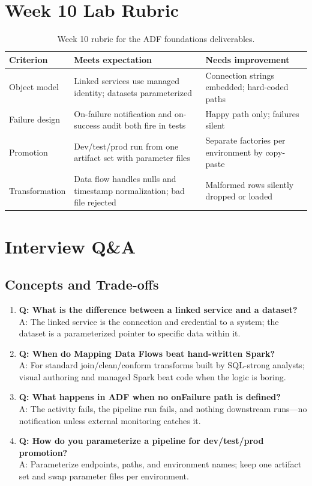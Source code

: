 \section{Week 10 Lab Rubric}
\begin{table}[H]
\centering
\small
\begin{tabular}{@{}p{3.2cm}p{5.0cm}p{5.0cm}@{}}
\toprule
\textbf{Criterion} & \textbf{Meets expectation} & \textbf{Needs improvement} \\
\midrule
Object model & Linked services use managed identity; datasets parameterized & Connection strings embedded; hard-coded paths \\
Failure design & On-failure notification and on-success audit both fire in tests & Happy path only; failures silent \\
Promotion & Dev/test/prod run from one artifact set with parameter files & Separate factories per environment by copy-paste \\
Transformation & Data flow handles nulls and timestamp normalization; bad file rejected & Malformed rows silently dropped or loaded \\
\bottomrule
\end{tabular}
\caption{Week 10 rubric for the ADF foundations deliverables.}
\label{tab:ch10-rubric}
\end{table}

\section{Interview Q\&A}
\subsection{Concepts and Trade-offs}
\begin{enumerate}
    \item \textbf{Q: What is the difference between a linked service and a dataset?}\\
    A: The linked service is the connection and credential to a system; the dataset is a parameterized pointer to specific data within it.
    \item \textbf{Q: When do Mapping Data Flows beat hand-written Spark?}\\
    A: For standard join/clean/conform transforms built by SQL-strong analysts; visual authoring and managed Spark beat code when the logic is boring.
    \item \textbf{Q: What happens in ADF when no onFailure path is defined?}\\
    A: The activity fails, the pipeline run fails, and nothing downstream runs---no notification unless external monitoring catches it.
    \item \textbf{Q: How do you parameterize a pipeline for dev/test/prod promotion?}\\
    A: Parameterize endpoints, paths, and environment names; keep one artifact set and swap parameter files per environment.
\end{enumerate}

